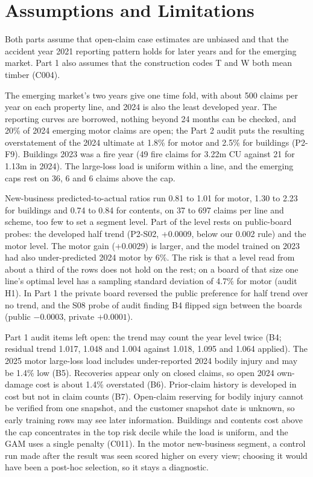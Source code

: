 \clearpage
\section{Assumptions and Limitations}
\label{ov:app-lim}

Both parts assume that open-claim case estimates are unbiased and that the accident year 2021 reporting pattern holds
for later years and for the emerging market. Part 1 also assumes that the construction codes T and W both mean timber
(C004).

The emerging market's two years give one time fold, with about 500 claims per year on each property line, and 2024 is
also the least developed year. The reporting curves are borrowed, nothing beyond 24 months can be checked, and 20\% of
2024 emerging motor claims are open; the Part 2 audit puts the resulting overstatement of the 2024 ultimate at 1.8\%
for motor and 2.5\% for buildings (P2-F9). Buildings 2023 was a fire year (49 fire claims for 3.22m CU against 21 for
1.13m in 2024). The large-loss load is uniform within a line, and the emerging caps rest on 36, 6 and 6 claims above
the cap.

New-business predicted-to-actual ratios run 0.81 to 1.01 for motor, 1.30 to 2.23 for buildings and 0.74 to 0.84 for
contents, on 37 to 697 claims per line and scheme, too few to set a segment level. Part of the level rests on
public-board probes: the developed half trend (P2-S02, +0.0009, below our 0.002 rule) and the motor level. The motor
gain (+0.0029) is larger, and the model trained on 2023 had also under-predicted 2024 motor by 6\%. The risk is that a
level read from about a third of the rows does not hold on the rest; on a board of that size one line's optimal level
has a sampling standard deviation of 4.7\% for motor (audit H1). In Part 1 the private board reversed the public
preference for half trend over no trend, and the S08 probe of audit finding B4 flipped sign between the boards (public
$-0.0003$, private $+0.0001$).

Part 1 audit items left open: the trend may count the year level twice (B4; residual trend 1.017, 1.048 and 1.004
against 1.018, 1.095 and 1.064 applied). The 2025 motor large-loss load includes under-reported 2024 bodily injury and
may be 1.4\% low (B5). Recoveries appear only on closed claims, so open 2024 own-damage cost is about 1.4\% overstated
(B6). Prior-claim history is developed in cost but not in claim counts (B7). Open-claim reserving for bodily injury
cannot be verified from one snapshot, and the customer snapshot date is unknown, so early training rows may see later
information. Buildings and contents cost above the cap concentrates in the top risk decile while the load is uniform,
and the GAM uses a single penalty (C011). In the motor new-business segment, a control run made after the result was
seen scored higher on every view; choosing it would have been a post-hoc selection, so it stays a diagnostic.

